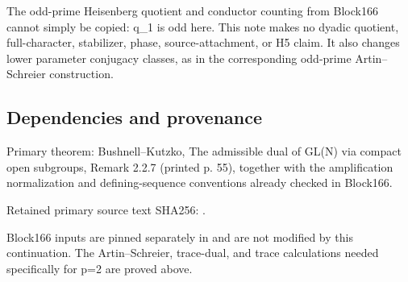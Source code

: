 The odd-prime Heisenberg quotient and conductor counting from Block166
cannot simply be copied: q\_1 is odd here. This note makes no dyadic
quotient, full-character, stabilizer, phase, source-attachment, or H5
claim. It also changes lower parameter conjugacy classes, as in the
corresponding odd-prime Artin--Schreier construction.

\hypertarget{dyadic_tower-dependencies-and-provenance}{%
\subsection{Dependencies and
provenance}\label{dyadic_tower-dependencies-and-provenance}}

Primary theorem: Bushnell--Kutzko, The admissible dual of GL(N) via
compact open subgroups, Remark 2.2.7 (printed p. 55), together with the
amplification normalization and defining-sequence conventions already
checked in Block166.

Retained primary source text SHA256:
.

Block166 inputs are pinned separately in  and are not
modified by this continuation. The Artin--Schreier, trace-dual, and
trace calculations needed specifically for p=2 are proved above.
